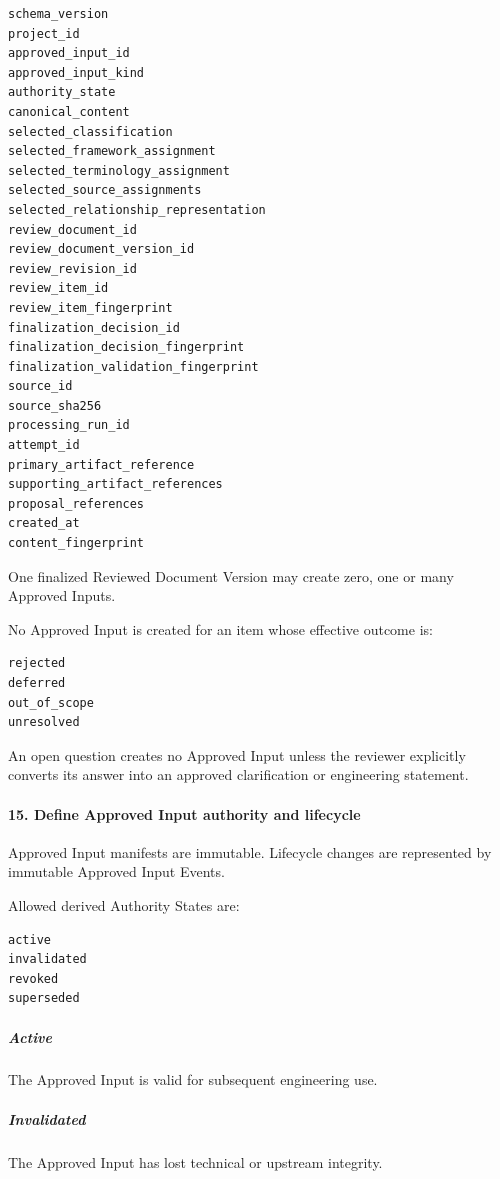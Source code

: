 \begin{verbatim}
schema_version
project_id
approved_input_id
approved_input_kind
authority_state
canonical_content
selected_classification
selected_framework_assignment
selected_terminology_assignment
selected_source_assignments
selected_relationship_representation
review_document_id
review_document_version_id
review_revision_id
review_item_id
review_item_fingerprint
finalization_decision_id
finalization_decision_fingerprint
finalization_validation_fingerprint
source_id
source_sha256
processing_run_id
attempt_id
primary_artifact_reference
supporting_artifact_references
proposal_references
created_at
content_fingerprint
\end{verbatim}

One finalized Reviewed Document Version may create zero, one or many Approved Inputs.

No Approved Input is created for an item whose effective outcome is:

\begin{verbatim}
rejected
deferred
out_of_scope
unresolved
\end{verbatim}

An open question creates no Approved Input unless the reviewer explicitly converts its answer into an approved clarification or engineering statement.

\hypertarget{15-define-approved-input-authority-and-lifecycle}{%
\paragraph{15. Define Approved Input authority and lifecycle}\label{15-define-approved-input-authority-and-lifecycle}}

Approved Input manifests are immutable. Lifecycle changes are represented by immutable Approved Input Events.

Allowed derived Authority States are:

\begin{verbatim}
active
invalidated
revoked
superseded
\end{verbatim}

\hypertarget{active}{%
\subparagraph{Active}\label{active}}

The Approved Input is valid for subsequent engineering use.

\hypertarget{invalidated}{%
\subparagraph{Invalidated}\label{invalidated}}

The Approved Input has lost technical or upstream integrity.

